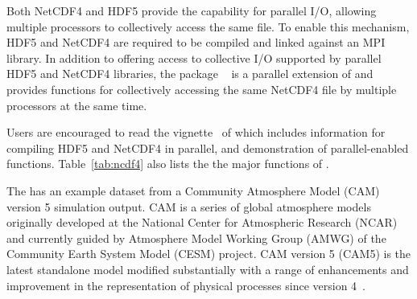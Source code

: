 Both NetCDF4 and HDF5 provide the capability for parallel I/O, allowing
multiple processors to collectively access the same file. To enable this
mechanism, HDF5 and NetCDF4 are required to be compiled and linked against
an MPI library. In addition to offering access to collective 
I/O supported by parallel HDF5 and NetCDF4 libraries, the  package 
~\citep{Patel2013pbdNCDF4package} is a parallel extension of 
 and provides functions for collectively accessing the same
NetCDF4 file by multiple processors at the same time. 

Users are encouraged to read the vignette~\citep{Patel2013pbdNCDF4vignette} of 
 which includes information for compiling HDF5 and NetCDF4 in 
parallel, and demonstration of parallel-enabled functions. Table~\ref{tab:ncdf4} 
also lists the the major functions of .

The  has an example dataset  from a
Community Atmosphere Model (CAM) version 5 simulation output.
CAM is a series of global atmosphere models originally developed at the 
National Center for Atmospheric Research (NCAR) and currently guided by 
Atmosphere Model Working Group (AMWG) of the Community Earth System Model (CESM)
project. CAM version 5 (CAM5) is the latest standalone model modified
substantially with a range of enhancements and improvement in the 
representation of physical processes since version 4~\citep{CAM5,CESM1}.

